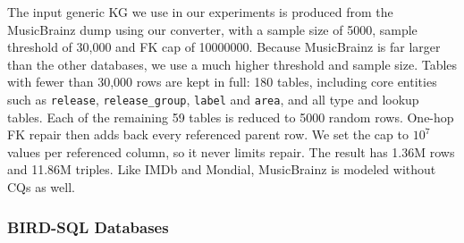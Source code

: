 The input generic KG we use in our experiments is produced from the MusicBrainz dump using our converter, with a sample size of 5000, sample threshold of 30,000 and FK cap of 10000000. Because MusicBrainz is far larger than the other databases, we use a much higher threshold and sample size. Tables with fewer than 30,000 rows are kept in full: 180 tables, including core entities such as \texttt{release}, \texttt{release\_group}, \texttt{label} and \texttt{area}, and all type and lookup tables. Each of the remaining 59 tables is reduced to 5000 random rows. One-hop FK repair then adds back every referenced parent row. We set the cap to \(10^{7}\) values per referenced column, so it never limits repair. The result has 1.36M rows and 11.86M triples. Like IMDb and Mondial, MusicBrainz is modeled without CQs as well.


\subsubsection{BIRD-SQL Databases}

